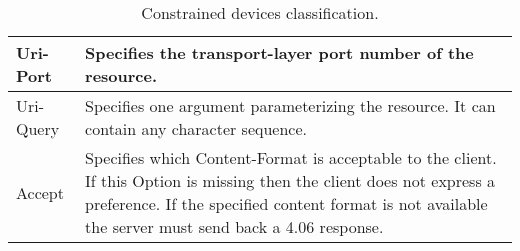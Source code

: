 \begin{table}[h!]
\begin{center}
\begin{tabularx}{\textwidth}{|l|X|}
				Uri-Port & Specifies the transport-layer port number of the resource.\\\hline
				
				Uri-Query & Specifies one argument parameterizing the resource.
				It can contain any character sequence.\\\hline
				
				Accept & Specifies which Content-Format is acceptable to the client.
				If this Option is missing then the client does not express a preference.
				If the specified content format is not available the server must send back a 4.06 response.\\\hline
				
			\end{tabularx}
			\caption{Constrained devices classification.}
			\label{tab:table7}
		\end{center}
	\end{table}
